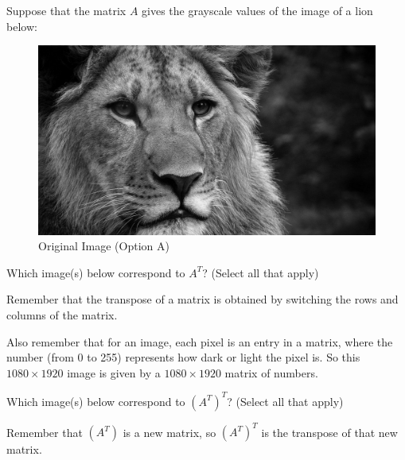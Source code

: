\documentclass{ximera}
\author{Zack Reed}
\begin{document}
\begin{exercise}

  Suppose that the matrix $A$ gives the grayscale values of the image of a lion below:

  \begin{figure}[h]
    \centering
      \includegraphics[width=.5\textwidth]{test_image.jpg}
      \caption{Original Image (Option A)}
      \label{fig:original}
  \end{figure}
  
  Which image(s) below correspond to $A^T$? (Select all that apply)
  
  \begin{hint}
  
    Remember that the transpose of a matrix is obtained by switching the rows and columns of the matrix.

    Also remember that for an image, each pixel is an entry in a matrix, where the number (from 0 to 255) represents how dark or light the pixel is. So this $1080 \times 1920$ image is given by a $1080 \times 1920$ matrix of numbers.

  \end{hint}

  \begin{selectAll}
  
  
  \end{selectAll}
  
  Which image(s) below correspond to $(A^T)^T$? (Select all that apply)

  \begin{hint}
  
    Remember that $(A^T)$ is a new matrix, so $(A^T)^T$ is the transpose of that new matrix.

  \end{hint}
  
  \begin{selectAll}
  
  

\end{selectAll}
\end{exercise}
\end{document}
